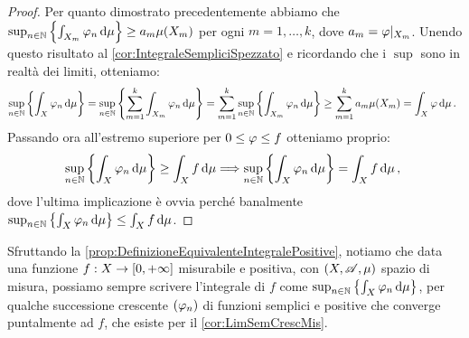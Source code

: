 \begin{proof}
	Per quanto dimostrato precedentemente abbiamo che $\sup_{n\in\mathbb N}\left\{\int_{X_m}\varphi_n\,\mathrm d\mu\right\}\ge a_m\mu(X_m)$ per ogni $m=1,\dots,k$, dove $a_m=\varphi|_{X_m}$. Unendo questo risultato al \cref{cor:IntegraleSempliciSpezzato} e ricordando che i $\sup$ sono in realtà dei limiti, otteniamo:
	\begin{equation*}
		\sup_{n\in\mathbb N}\left\{\int_X\varphi_n\,\mathrm d\mu\right\}=\sup_{n\in\mathbb N}\left\{\sum_{m=1}^k \int_{X_m}\varphi_n\,\mathrm d \mu\right\}=\sum_{m=1}^k\sup_{n\in\mathbb N}\left\{ \int_{X_m}\varphi_n\,\mathrm d \mu\right\}\ge \sum_{m=1}^ka_m\mu(X_m)=\int_X\varphi\,\mathrm d\mu\, \text{. }
	\end{equation*}
	Passando ora all'estremo superiore per $0\le \varphi \le f$ otteniamo proprio:
	\begin{equation*}
		\sup_{n\in\mathbb N}\left\{\int_X\varphi_n\,\mathrm d\mu\right\}\ge \int_X f \,\mathrm d\mu\Longrightarrow \sup_{n\in\mathbb N}\left\{\int_X\varphi_n\,\mathrm d\mu\right\}= \int_X f\,\mathrm d\mu\, \text{, }
	\end{equation*}
	dove l'ultima implicazione è ovvia perché banalmente $\sup_{n\in\mathbb N}\left\{\int_X\varphi_n\,\mathrm d\mu\right\}\le \int_X f\,\mathrm d\mu$.
\end{proof}

\begin{remark}\label{nota:ApprossimazioneIntegralePositiveConSemplici}
	Sfruttando la \cref{prop:DefinizioneEquivalenteIntegralePositive}, notiamo che data una funzione $f:X\to[0,+\infty]$ misurabile e positiva, con $(X,\mathscr A,\mu)$ spazio di misura, possiamo sempre scrivere l'integrale di $f$ come $\sup_{n\in\mathbb N}\left\{\int_X\varphi_n\,\mathrm d\mu\right\}$, per qualche successione crescente $(\varphi_n)$ di funzioni semplici e positive che converge puntalmente ad $f$, che esiste per il \cref{cor:LimSemCrescMis}.
\end{remark}


